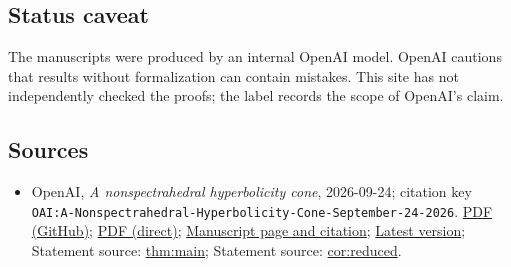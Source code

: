 \documentclass[11pt]{article}
\begin{document}
\subsection{Status caveat}
The manuscripts were produced by an internal OpenAI model. OpenAI cautions that results without formalization can contain mistakes. This site has not independently checked the proofs; the label records the scope of OpenAI's claim.

\subsection{Sources}
\begin{itemize}
\item OpenAI, \emph{A nonspectrahedral hyperbolicity cone}, 2026-09-24; citation key \texttt{OAI:A-Nonspectrahedral-Hyperbolicity-Cone-September-24-2026}. \href{https://github.com/openai/math/blob/adc7f1241b42e322a6451854ab7e4b4c146bf78a/preprints/A-Nonspectrahedral-Hyperbolicity-Cone-September-24-2026/nonspectrahedral-hyperbolicity-cone.pdf}{PDF (GitHub)}; \href{https://github.com/openai/math/raw/adc7f1241b42e322a6451854ab7e4b4c146bf78a/preprints/A-Nonspectrahedral-Hyperbolicity-Cone-September-24-2026/nonspectrahedral-hyperbolicity-cone.pdf}{PDF (direct)}; \href{https://github.com/openai/math/blob/adc7f1241b42e322a6451854ab7e4b4c146bf78a/preprints/A-Nonspectrahedral-Hyperbolicity-Cone-September-24-2026/README.md}{Manuscript page and citation}; \href{https://github.com/openai/math/blob/main/preprints/A-Nonspectrahedral-Hyperbolicity-Cone-September-24-2026/nonspectrahedral-hyperbolicity-cone.pdf}{Latest version}; Statement source: \href{https://github.com/openai/math/blob/adc7f1241b42e322a6451854ab7e4b4c146bf78a/preprints/A-Nonspectrahedral-Hyperbolicity-Cone-September-24-2026/build/sections/01-introduction.tex\#L63}{thm:main}; Statement source: \href{https://github.com/openai/math/blob/adc7f1241b42e322a6451854ab7e4b4c146bf78a/preprints/A-Nonspectrahedral-Hyperbolicity-Cone-September-24-2026/build/sections/01-introduction.tex\#L78}{cor:reduced}.

\end{itemize}
\end{document}
